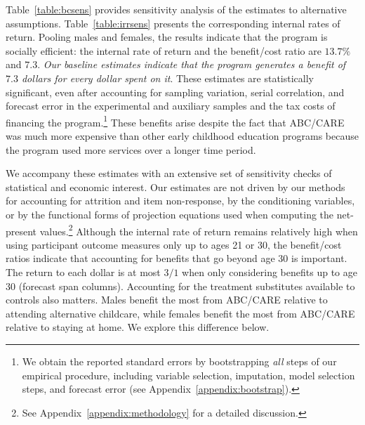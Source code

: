 Table~\ref{table:bcsens} provides sensitivity analysis of the estimates to alternative assumptions. Table~\ref{table:irrsens} presents the corresponding internal rates of return. Pooling males and females, the results indicate that the program is socially efficient: the internal rate of return and the benefit/cost ratio are $13.7\%$ and $7.3$. \textit{Our baseline estimates indicate that the program generates a benefit of $7.3$ dollars for every dollar spent on it}. These estimates are statistically significant, even after accounting for sampling variation, serial correlation, and forecast error in the experimental and auxiliary samples and the tax costs of financing the program.\footnote{We obtain the reported standard errors by bootstrapping \emph{all} steps of our empirical procedure, including variable selection, imputation, model selection steps, and forecast error (see  Appendix~\ref{appendix:bootstrap}).} These benefits arise despite the fact that ABC/CARE was much more expensive than other early childhood education programs because the program used more services over a longer time period.

We accompany these estimates with an extensive set of sensitivity checks of statistical and economic interest. Our estimates are not driven by our methods for accounting for attrition and item non-response, by the conditioning variables, or by the functional forms of projection equations used when computing the net-present values.\footnote{See Appendix~\ref{appendix:methodology} for a detailed discussion.} Although the internal rate of return remains relatively high when using participant outcome measures only up to ages 21 or 30, the benefit/cost ratios indicate that accounting for benefits that go beyond age 30 is important. The return to each dollar is at most $3/1$ when only considering benefits up to age 30 (forecast span columns). Accounting for the treatment substitutes available to controls also matters. Males benefit the most from ABC/CARE relative to attending alternative childcare, while females benefit the most from ABC/CARE relative to staying at home. We explore this difference below.

